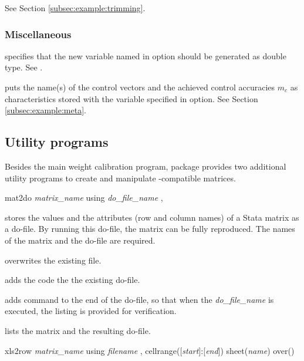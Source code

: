 See Section \ref{subsec:example:trimming}.

\subsubsection{Miscellaneous}

\hangpara
{} specifies that the new variable named in 
option should be generated as double type. See .


\hangpara
{} puts the name(s) of the control vectors and the achieved control
    accuracies $m_c$ as characteristics stored with the variable specified in
     option. See Section \ref{subsec:example:meta}.

\subsection{Utility programs}

Besides the main weight calibration program,  package provides
two additional utility programs to create and manipulate
-compatible matrices.

\begin{stsyntax}
mat2do
{\it matrix\_name}
using
{\it do\_file\_name}
,
\end{stsyntax}

 stores the values and the attributes (row and column names)
of a Stata matrix as a do-file. By running this do-file, the matrix can be fully
reproduced. The names of the matrix and the do-file are required.

\hangpara
{} overwrites the existing file.

\hangpara
{} adds the code the the existing do-file.

\hangpara
{} adds  command to the end of the do-file,
so that when the {\it do\_file\_name} is executed, the listing is provided
for verification.

\hangpara
{} lists the matrix and the resulting do-file.




\begin{stsyntax}
xls2row
{\it matrix\_name}
using
{\it filename}
,
cellrange([{\it start}]:[{\it end}])
sheet({\it name})
over(\varname)
\end{stsyntax}

